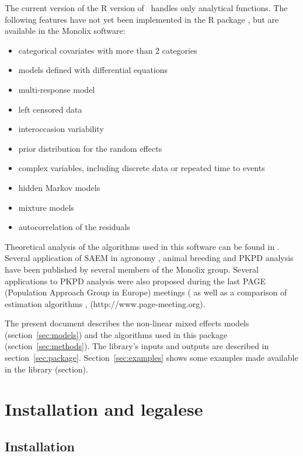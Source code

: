 The current version of the R version of \monolix~handles only analytical functions. The following features have not yet been implemented in the R package \monolix, but are available in the {\sc Monolix} software:
\begin{itemize}
\item categorical covariates with more than 2 categories
\item models defined with differential equations
\item multi-response model
\item left censored data
\item interoccasion variability
\item prior distribution for the random effects
\item complex variables, including discrete data or repeated time to events
\item hidden Markov models
\item mixture models
\item autocorrelation of the residuals
\end{itemize}

Theoretical analysis of the algorithms used in this software can be found in \cite{Delyon, samson_jspi06, Kuhn01, Kuhn05}. Several application of SAEM in agronomy \cite{Makowski06}, animal breeding \cite{Jaffrezic06} and PKPD analysis \cite{Comets07, Lavielle07, samson_csda06, samson_sim06a, Bertrand09} have been published by several members of the {\sf Monolix} group. Several applications to PKPD analysis were also proposed during the last PAGE (Population Approach Group in Europe) meetings (\cite{page06b, page05a, page03, page04a, page06c, page05b} as well as a comparison of estimation algorithms \cite{page05c}, ({http://www.page-meeting.org}).

The present document describes the non-linear mixed effects models (section~\ref{sec:models}) and the algorithms used in this package (section~\ref{sec:methods}). The library's inputs and outputs are described in section~\ref{sec:package}. Section~\ref{sec:examples} shows some examples made available in the library (section).

\section{Installation and legalese} \label{sec:installation}

\subsection{Installation}

